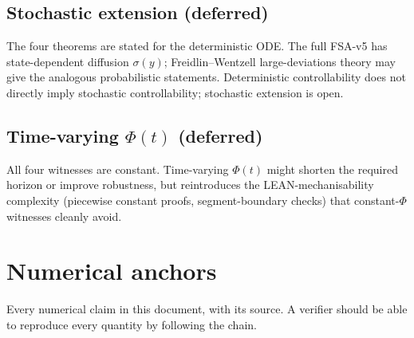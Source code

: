 \documentclass[11pt,a4paper]{article}
\theoremstyle{definition}
\begin{document}
\subsection{Stochastic extension (deferred)}

The four theorems are stated for the deterministic ODE. The full FSA-v5 has state-dependent diffusion $\sigma(y)$; Freidlin--Wentzell large-deviations theory may give the analogous probabilistic statements. Deterministic controllability does not directly imply stochastic controllability; stochastic extension is open.

\subsection{Time-varying $\Phi(t)$ (deferred)}

All four witnesses are constant. Time-varying $\Phi(t)$ might shorten the required horizon or improve robustness, but reintroduces the LEAN-mechanisability complexity (piecewise constant proofs, segment-boundary checks) that constant-$\Phi$ witnesses cleanly avoid.

\appendix

\section{Numerical anchors} \label{app:anchors}

Every numerical claim in this document, with its source. A verifier should be able to reproduce every quantity by following the chain.
\end{document}

